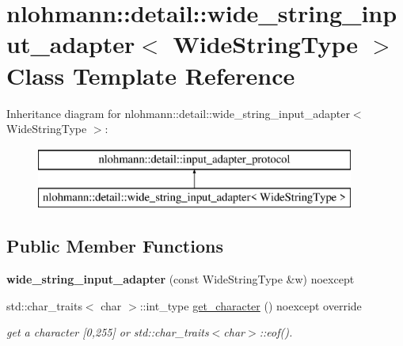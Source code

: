 \hypertarget{classnlohmann_1_1detail_1_1wide__string__input__adapter}{}\section{nlohmann\+:\+:detail\+:\+:wide\+\_\+string\+\_\+input\+\_\+adapter$<$ Wide\+String\+Type $>$ Class Template Reference}
\label{classnlohmann_1_1detail_1_1wide__string__input__adapter}
Inheritance diagram for nlohmann\+:\+:detail\+:\+:wide\+\_\+string\+\_\+input\+\_\+adapter$<$ Wide\+String\+Type $>$\+:\begin{figure}[H]
\begin{center}
\leavevmode
\includegraphics[height=2.000000cm]{classnlohmann_1_1detail_1_1wide__string__input__adapter}
\end{center}
\end{figure}
\subsection*{Public Member Functions}
\begin{DoxyCompactItemize}
\item 
\mbox{\label{classnlohmann_1_1detail_1_1wide__string__input__adapter_a85c8bddae20bc00d64dd7a2c87109357}} 
{\bfseries wide\+\_\+string\+\_\+input\+\_\+adapter} (const Wide\+String\+Type \&w) noexcept
\item 
\mbox{\label{classnlohmann_1_1detail_1_1wide__string__input__adapter_abb62b34cf77e557ce5321b7f2490c3b0}} 
std\+::char\+\_\+traits$<$ char $>$\+::int\+\_\+type \mbox{\hyperlink{classnlohmann_1_1detail_1_1wide__string__input__adapter_abb62b34cf77e557ce5321b7f2490c3b0}{get\+\_\+character}} () noexcept override
\begin{DoxyCompactList}\small\item\em get a character \mbox{[}0,255\mbox{]} or std\+::char\+\_\+traits$<$char$>$\+::eof(). \end{DoxyCompactList}\end{DoxyCompactItemize}
